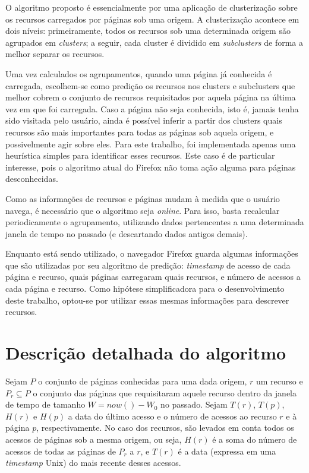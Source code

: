 \documentclass[10pt,twocolumn,letterpaper]{article}
\begin{document}
O algoritmo proposto é essencialmente por uma aplicação de clusterização sobre os recursos carregados por páginas sob uma origem. A clusterização acontece em dois níveis: primeiramente, todos os recursos sob uma determinada origem são agrupados em \emph{clusters}; a seguir, cada cluster é dividido em \emph{subclusters} de forma a melhor separar os recursos.

Uma vez calculados os agrupamentos, quando uma página já conhecida é carregada, escolhem-se como predição os recursos nos clusters e subclusters que melhor cobrem o conjunto de recursos requisitados por aquela página na última vez em que foi carregada. Caso a página não seja conhecida, isto é, jamais tenha sido visitada pelo usuário, ainda é possível inferir a partir dos clusters quais recursos são mais importantes para todas as páginas sob aquela origem, e possivelmente agir sobre eles. Para este trabalho, foi implementada apenas uma heurística simples para identificar esses recursos. Este caso é de particular interesse, pois o algoritmo atual do Firefox não toma ação alguma para páginas desconhecidas. 

Como as informações de recursos e páginas mudam à medida que o usuário navega, é necessário que o algoritmo seja \emph{online}. Para isso, basta recalcular periodicamente o agrupamento, utilizando dados pertencentes a uma determinada janela de tempo no passado (e descartando dados antigos demais).

Enquanto está sendo utilizado, o navegador Firefox guarda algumas informações que são utilizadas por seu algoritmo de predição: \emph{timestamp} de acesso de cada página e recurso, quais páginas carregaram quais recursos, e número de acessos a cada página e recurso. Como hipótese simplificadora para o desenvolvimento deste trabalho, optou-se por utilizar essas mesmas informações para descrever recursos.

\section{Descrição detalhada do algoritmo}
\label{sec-algorithm-detail}

Sejam $P$ o conjunto de páginas conhecidas para uma dada origem, $r$ um recurso e $P_{r} \subseteq P$ o conjunto das páginas que requisitaram aquele recurso dentro da janela de tempo de tamanho $W = now() - W_0$ no passado. Sejam $T(r)$,  $T(p)$, $H(r)$ e $H(p)$ a data do último acesso e o número de acessos ao recurso $r$ e à página $p$, respectivamente. No caso dos recursos, são levados em conta todos os acessos de páginas sob a mesma origem, ou seja, $H(r)$ é a soma do número de acessos de todas as páginas de $P_{r}$ a $r$, e $T(r)$ é a data (expressa em uma \emph{timestamp} Unix) do mais recente desses acessos.
\end{document}
